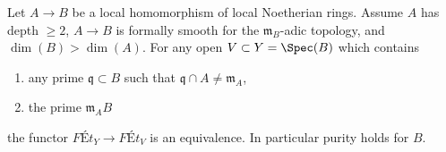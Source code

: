 \begin{proposition}
\label{proposition-purity-smooth-over-depth2}
Let $A \to B$ be a local homomorphism of local Noetherian rings.
Assume $A$ has depth $\geq 2$, $A \to B$ is formally smooth for the
$\mathfrak m_B$-adic topology, and $\dim(B) > \dim(A)$. For any open
$V \subset Y = \Spec(B)$ which contains
\begin{enumerate}
\item any prime $\mathfrak q \subset B$ such that
$\mathfrak q \cap A \not = \mathfrak m_A$,
\item the prime $\mathfrak m_A B$
\end{enumerate}
the functor $\textit{F\'Et}_Y \to \textit{F\'Et}_V$
is an equivalence. In particular purity holds for $B$.
\end{proposition}


